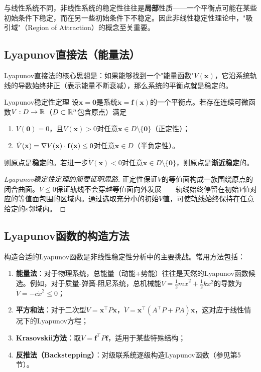 \begin{remark}
与线性系统不同，非线性系统的稳定性往往是\textbf{局部}性质——一个平衡点可能在某些初始条件下稳定，而在另一些初始条件下不稳定。因此非线性稳定性理论中，"吸引域"（Region of Attraction）的概念至关重要。
\end{remark}

\subsection{Lyapunov直接法（能量法）}

Lyapunov直接法的核心思想是：如果能够找到一个"能量函数"$V(\mathbf{x})$，它沿系统轨线的导数始终非正（表示能量不断衰减），那么系统的平衡点就是稳定的。

\begin{myTheorem}{Lyapunov稳定性定理}
设$\mathbf{x} = \mathbf{0}$是系统$\dot{\mathbf{x}} = \mathbf{f}(\mathbf{x})$的一个平衡点。若存在连续可微函数$V: D \to \mathbb{R}$（$D \subset \mathbb{R}^n$包含原点）满足
\begin{enumerate}
\item $V(\mathbf{0}) = 0$，且$V(\mathbf{x}) > 0$对任意$\mathbf{x} \in D \setminus \{\mathbf{0}\}$（正定性）；
\item $\dot{V}(\mathbf{x}) = \nabla V(\mathbf{x}) \cdot \mathbf{f}(\mathbf{x}) \le 0$对任意$\mathbf{x} \in D$（半负定性）。
\end{enumerate}
则原点是\textbf{稳定}的。若进一步$\dot{V}(\mathbf{x}) < 0$对任意$\mathbf{x} \in D \setminus \{\mathbf{0}\}$，则原点是\textbf{渐近稳定}的。
\end{myTheorem}

\begin{proof}[Lyapunov稳定性定理的简要证明思路]
正定性保证$V$的等值面构成一族围绕原点的闭合曲面。$\dot{V} \le 0$保证轨线不会穿越等值面向外发展——轨线始终停留在初始$V$值对应的等值面包围的区域内。通过选取充分小的初始$V$值，可使轨线始终保持在任意给定的$\varepsilon$邻域内。
\end{proof}

\subsection{Lyapunov函数的构造方法}

构造合适的Lyapunov函数是非线性稳定性分析中的主要挑战。常用方法包括：

\begin{enumerate}
\item \textbf{能量法}：对于物理系统，总能量（动能+势能）往往是天然的Lyapunov函数候选。例如，对于质量-弹簧-阻尼系统，总机械能$V = \frac{1}{2}m\dot{x}^2 + \frac{1}{2}kx^2$的导数为$\dot{V} = -c\dot{x}^2 \le 0$；
\item \textbf{平方和法}：对于二次型$V = \mathbf{x}^{\top}P\mathbf{x}$，$\dot{V} = \mathbf{x}^{\top}(A^{\top}P + PA)\mathbf{x}$，这对应于线性情况下的Lyapunov方程；
\item \textbf{Krasovskii方法}：取$V = \mathbf{f}^{\top}P\mathbf{f}$，适用于某些特殊结构；
\item \textbf{反推法（Backstepping）}：对级联系统逐级构造Lyapunov函数（参见第5节）。
\end{enumerate}

